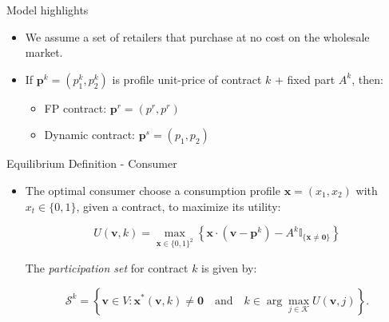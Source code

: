 \documentclass{class}
\begin{document}
\begin{frame}{Model highlights}
\begin{itemize}
\vfill
        
    \item We assume a set of retailers that purchase at no cost on the wholesale market.

    \vfill

 
    \item If $\textbf{p}^k=(p_1^k,p_2^k)$ is profile unit-price of contract $k$ + fixed part $A^k$, then:  \vfill

    \begin{itemize}
        \item FP contract: $\textbf{p}^{r} =  (p^r,p^r)$ \item Dynamic contract: $\textbf{p}^{s} =  (p_1,p_2)$
    \end{itemize}

\end{itemize}
\end{frame}





\begin{frame}{Equilibrium Definition - Consumer}


\begin{itemize}

\item The optimal consumer choose a consumption profile $\textbf{x} = (x_1,x_2)$ with $x_t \in\{0,1\}$, given a contract, to maximize its utility:

\vfill

\begin{equation*}
    U(\mathbf{v}, k) = \max_{\mathbf{x} \in \{0,1\}^2} \left\{ \mathbf{x} \cdot (\mathbf{v} - \mathbf{p}^k) - A^k \mathbb{I}_{\{\mathbf{x} \neq \mathbf{0}\}} \right\}
\end{equation*}

\vfill
The \textit{participation set} for contract $k$ is given by:

\begin{equation*} \label{eq:active_set_general}
    \mathcal{S}^k = \left\{ \mathbf{v} \in V : \mathbf{x}^*(\mathbf{v},k) \neq \mathbf{0} \quad \text{and} \quad k \in \arg\max_{j \in \mathcal{K}} U(\mathbf{v}, j) \right\}.
\end{equation*}

\vfill
    
\end{itemize}
    
\end{frame}
\end{document}
